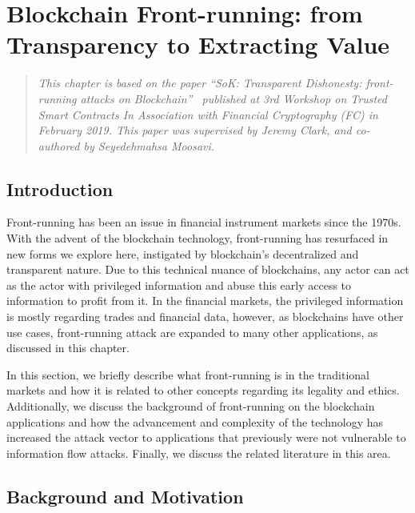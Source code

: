 

\chapter{Blockchain Front-running: from Transparency to Extracting Value} \label{sec:frontrunning}




\begin{quote}
	\textit{This chapter is based on the paper ``SoK: Transparent Dishonesty: front-running attacks on Blockchain''~\cite{eskandari2019sok} published at 3rd Workshop on Trusted Smart Contracts In Association with Financial Cryptography (FC) in February 2019. This paper was supervised by Jeremy Clark, and co-authored by Seyedehmahsa Moosavi.}
\end{quote}


\section{Introduction}

Front-running has been an issue in financial instrument markets since the 1970s. With the advent of the blockchain technology, front-running has resurfaced in new forms we explore here, instigated by blockchain's decentralized and transparent nature. Due to this technical nuance of blockchains, any actor can act as the actor with privileged information and abuse this early access to information to profit from it. In the financial markets, the privileged information is mostly regarding trades and financial data, however, as blockchains have other use cases, front-running attack are expanded to many other applications, as discussed in this chapter. 

In this section, we briefly describe what front-running is in the traditional markets and how it is related to other concepts regarding its legality and ethics. Additionally, we discuss the background of front-running on the blockchain applications and how the advancement and complexity of the technology has increased the attack vector to applications that previously were not vulnerable to information flow attacks. Finally, we discuss the related literature in this area. 


\section{Background and Motivation}


